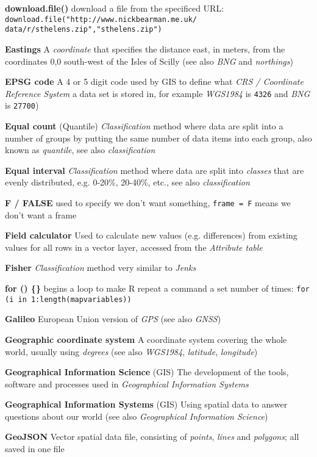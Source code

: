 \documentclass[a4paper,10pt]{article}
\begin{document}
\begin{multicols}{2}
\textbf{download.file()} download a file from the specificed URL: \texttt{download.file("http://www.nickbearman.me.uk/
data/r/sthelens.zip","sthelens.zip")}

\textbf{Eastings} A \textit{coordinate} that specifies the distance east, in meters, from the coordinates 0,0 south-west of the Isles of Scilly (see also \textit{BNG} and \textit{northings})

\textbf{EPSG code} A 4 or 5 digit code used by GIS to define what \textit{CRS / Coordinate Reference System} a data set is stored in, for example \textit{WGS1984} is \texttt{4326} and \textit{BNG} is \texttt{27700})

\textbf{Equal count} (Quantile) \textit{Classification} method where data are split into a number of groups by putting the same number of data items into each group, also known as \textit{quantile}, see also \textit{classification}

\textbf{Equal interval} \textit{Classification} method where data are split into \textit{classes} that are evenly distributed, e.g. 0-20\%, 20-40\%, etc., see also \textit{classification} 

\textbf{F / FALSE} used to specify we don't want something, \texttt{frame = F} means we don't want a frame

\textbf{Field calculator} Used to calculate new values (e.g. differences) from existing values for all rows in a vector layer, accessed from the \textit{Attribute table} 

\textbf{Fisher} \textit{Classification} method very similar to \textit{Jenks} 

\textbf{for () \{\}} begins a loop to make R repeat a command a set number of times: \texttt {for (i in 1:length(mapvariables))}

\textbf{Galileo} European Union version of \textit{GPS} (see also \textit{GNSS})

\textbf{Geographic coordinate system} A coordinate system covering the whole world, usually using \textit{degrees} (see also \textit{WGS1984}, \textit{latitude}, \textit{longitude})

\textbf{Geographical Information Science} (GIS) The development of the tools, software and processes used in \textit{Geographical Information Systems} 

\textbf{Geographical Information Systems} (GIS) Using spatial data to answer questions about our world (see also \textit{Geographical Information Science})

\textbf{GeoJSON} Vector spatial data file, consisting of \textit{points}, \textit{lines} and \textit{polygons}; all saved in one file


\end{multicols}
\end{document}
